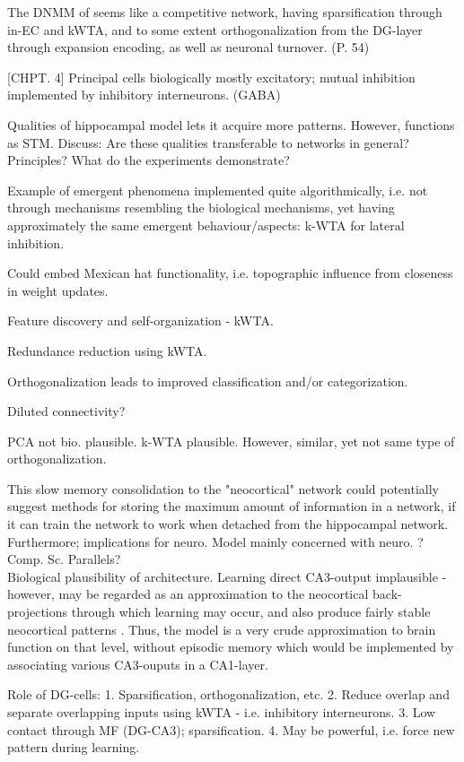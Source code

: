 The DNMM of \cite{Hattori2014} seems like a competitive network, having sparsification through in-EC and kWTA, and to some extent orthogonalization from the DG-layer through expansion encoding, as well as neuronal turnover. (P. 54)

[CHPT. 4]
Principal cells biologically mostly excitatory; mutual inhibition implemented by inhibitory interneurons. (GABA)

Qualities of hippocampal model lets it acquire more patterns. However, functions as STM. Discuss: Are these qualities transferable to networks in general? Principles? What do the experiments demonstrate?

Example of emergent phenomena implemented quite algorithmically, i.e. not through mechanisms resembling the biological mechanisms, yet having approximately the same emergent behaviour/aspects: k-WTA for lateral inhibition.

Could embed Mexican hat functionality, i.e. topographic influence from closeness in weight updates.

Feature discovery and self-organization - kWTA.

Redundance reduction using kWTA.

Orthogonalization leads to improved classification and/or categorization.

Diluted connectivity?

PCA not bio. plausible. k-WTA plausible. However, similar, yet not same type of orthogonalization.

This slow memory consolidation to the "neocortical" network could potentially suggest methods for storing the maximum amount of information in a network, if it can train the network to work when detached from the hippocampal network.
\\
Furthermore; implications for neuro. Model mainly concerned with neuro. ? Comp. Sc. Parallels?
\\

Biological plausibility of \citep{McClelland1995} architecture. Learning direct CA3-output implausible - however, may be regarded as an approximation to the neocortical back-projections through which learning may occur, and also produce fairly stable neocortical patterns \citep{Rolls1998chpt6}. Thus, the model is a very crude approximation to brain function on that level, without episodic memory which would be implemented by associating various CA3-ouputs in a CA1-layer.

Role of DG-cells: 
1. Sparsification, orthogonalization, etc.
2. Reduce overlap and separate overlapping inputs using kWTA - i.e. inhibitory interneurons.
3. Low contact through MF (DG-CA3); sparsification.
4. May be powerful, i.e. force new pattern during learning.
\citep{Rolls1998chpt6}
\\

